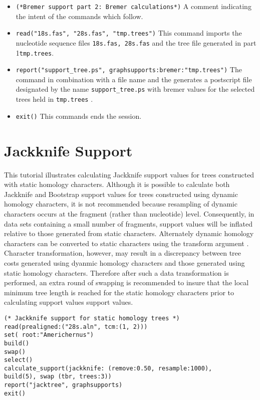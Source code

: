 \begin{itemize}
\item \texttt{(*Bremer support part 2: Bremer calculations*)}  A comment indicating the intent of the commands which follow.
\item \texttt{read("18s.fas", "28s.fas", "tmp.trees")} This command imports the nucleotide sequence files \texttt{18s.fas, 28s.fas} and the tree file generated in part 1\texttt{tmp.trees}.
\item \texttt{report("support\_tree.ps", graphsupports:bremer:"tmp.trees")}  The  command in combination with a file name and the  generates a postscript file designated by the name \texttt{support\_tree.ps} with bremer values for the selected trees held in \texttt{tmp.trees} . 
\item \texttt{exit()} This commands ends the \poy session.
\end{itemize}

\section{Jackknife Support}{\label{tutorial 4}}

This tutorial illustrates calculating Jackknife support values for trees constructed with static homology characters.  Although it is possible to calculate both Jackknife and Bootstrap support values 
for trees constructed using dynamic homology characters, it is not recommended because resampling of dynamic characters occurs at the fragment (rather than nucleotide) level.  Consequently, in data sets containing a small number of fragments, support values will be inflated relative to those generated from static characters.  Alternately dynamic homology characters can be converted to static characters using the transform argument .  Character transformation, however, may result in a discrepancy between tree costs generated using dyanmic homology characters and those generated using static homology characters.  Therefore after such a data transformation is performed, an extra round of swapping is recommended to insure that the local minimum tree length is reached for the static homology characters prior to calculating support values  support values.

\begin{verbatim}
(* Jackknife support for static homology trees *)
read(prealigned:("28s.aln", tcm:(1, 2)))
set( root:"Americhernus")
build()
swap()
select()
calculate_support(jackknife: (remove:0.50, resample:1000), 
build(5), swap (tbr, trees:3))
report("jacktree", graphsupports)
exit()
\end{verbatim}

